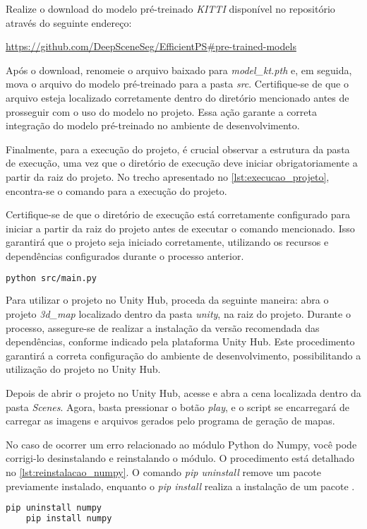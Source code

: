 Realize o download do modelo pré-treinado \emph{KITTI} disponível no repositório através do seguinte endereço:

\url{https://github.com/DeepSceneSeg/EfficientPS#pre-trained-models}

Após o download, renomeie o arquivo baixado para \emph{model\_kt.pth} e, em seguida, mova o arquivo do modelo pré-treinado para a pasta \emph{src}. Certifique-se de que o arquivo esteja localizado corretamente dentro do diretório mencionado antes de prosseguir com o uso do modelo no projeto. Essa ação garante a correta integração do modelo pré-treinado no ambiente de desenvolvimento.

Finalmente, para a execução do projeto, é crucial observar a estrutura da pasta de execução, uma vez que o diretório de execução deve iniciar obrigatoriamente a partir da raiz do projeto. No trecho apresentado no \cref{lst:execucao_projeto}, encontra-se o comando para a execução do projeto.

Certifique-se de que o diretório de execução está corretamente configurado para iniciar a partir da raiz do projeto antes de executar o comando mencionado. Isso garantirá que o projeto seja iniciado corretamente, utilizando os recursos e dependências configurados durante o processo anterior.

\begin{lstlisting}[caption={Trecho de código com comando para execução do projeto},label={lst:execucao_projeto},language=Bash,showstringspaces=false]
    python src/main.py
\end{lstlisting}

Para utilizar o projeto no Unity Hub, proceda da seguinte maneira: abra o projeto \emph{3d\_map} localizado dentro da pasta \emph{unity}, na raiz do projeto. Durante o processo, assegure-se de realizar a instalação da versão recomendada das dependências, conforme indicado pela plataforma Unity Hub. Este procedimento garantirá a correta configuração do ambiente de desenvolvimento, possibilitando a utilização do projeto no Unity Hub.

Depois de abrir o projeto no Unity Hub, acesse e abra a cena localizada dentro da pasta \emph{Scenes}. Agora, basta pressionar o botão \emph{play}, e o script se encarregará de carregar as imagens e arquivos gerados pelo programa de geração de mapas. 

No caso de ocorrer um erro relacionado ao módulo Python do Numpy, você pode corrigi-lo desinstalando e reinstalando o módulo. O procedimento está detalhado no \cref{lst:reinstalacao_numpy}. O comando \emph{pip uninstall} remove um pacote previamente instalado, enquanto o \emph{pip install} realiza a instalação de um pacote \cite{pip_install, pip_uninstall}.

\begin{lstlisting}[caption={Trecho de código com os comandos para reinstalação do Numpy},label={lst:reinstalacao_numpy},language=Bash,showstringspaces=false]
    pip uninstall numpy
    pip install numpy
\end{lstlisting}

